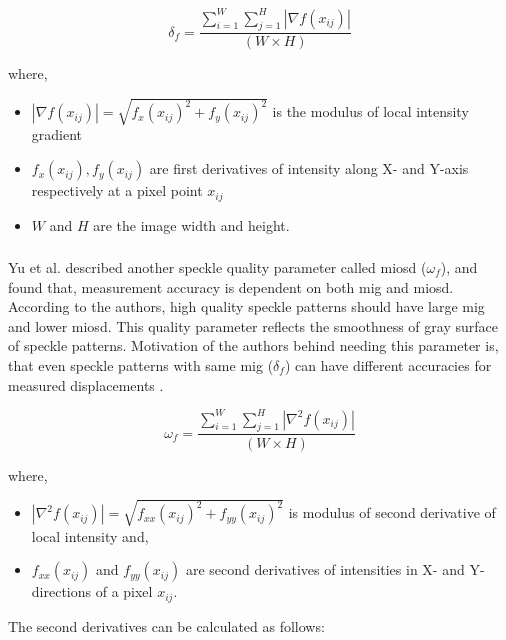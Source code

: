         \begin{equation}
            \delta_f = \dfrac{\displaystyle \sum_{i=1}^{W} \displaystyle \sum_{j=1}^{H} |\nabla f(x_{ij})|}{(W \times H)}
        \end{equation}

        \noindent where,
        \begin{itemize}
            \item \(|\nabla f(x_{ij})| = \sqrt{f_x(x_{ij})^2 + f_y(x_{ij})^2}\) is the modulus of local intensity gradient
            \item \( f_x(x_{ij}), f_y(x_{ij}) \) are first derivatives of intensity along X- and Y-axis respectively at a pixel point $x_{ij}$
            \item $W$ and $H$ are the image width and height.
        \end{itemize}
    
    \subsubsection{}
        Yu et al. described another speckle quality parameter called \gls{miosd} ($\omega_f$), and found that, measurement accuracy is dependent on both \gls{mig} and \gls{miosd}. According to the authors, high quality speckle patterns should have large \gls{mig} and lower \gls{miosd}. This quality parameter reflects the smoothness of gray surface of speckle patterns. Motivation of the authors behind needing this parameter is, that even speckle patterns with same \gls{mig} ($\delta_f$) can have different accuracies for measured displacements \cite{yu_miosd}. 

        \begin{equation}
            \omega_f = \dfrac{\displaystyle \sum_{i=1}^{W} \displaystyle \sum_{j=1}^{H} |\nabla^2 f(x_{ij})|}{(W \times H)} 
        \end{equation}

        \noindent where,
        \begin{itemize}
            \item \(|\nabla^2f(x_{ij})| = \sqrt{f_{xx}(x_{ij})^2 + f_{yy}(x_{ij})^2}\) is modulus of second derivative of local intensity and,
            \item $f_{xx}(x_{ij})$ and $f_{yy}(x_{ij})$ are second derivatives of intensities in X- and Y-directions of a pixel $x_{ij}$. 
        \end{itemize}

        \noindent The second derivatives can be calculated as follows:


